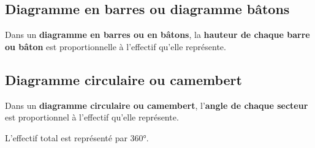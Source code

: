 \subsection{Diagramme en barres ou diagramme bâtons}
\begin{definition}
Dans un \textbf{diagramme en barres ou en bâtons}, la \textbf{hauteur de chaque barre ou bâton} est proportionnelle à l'effectif qu'elle repr\'esente.
\end{definition}
\begin{center}
\end{center}
\subsection{Diagramme circulaire ou camembert}
\vspace*{-15mm}
\begin{minipage}{0.8\linewidth}
   \begin{definition}
      Dans un \textbf{diagramme circulaire ou camembert}, l'\textbf{angle de chaque secteur} est proportionnel à l'effectif qu'elle repr\'esente.

      L'effectif total est représenté par \ang{360}.   
   \end{definition}
\end{minipage}
\hspace*{-15mm}
\begin{minipage}{0.2\linewidth}
   \begin{center}
   \end{center}
\end{minipage}

